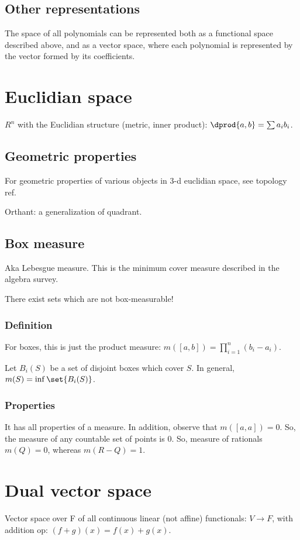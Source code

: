 \documentclass[oneside, article]{memoir}
\begin{document}
\subsection{Other representations}
The space of all polynomials can be represented both as a functional space described above, and as a vector space, where each polynomial is represented by the vector formed by its coefficients.

\section{Euclidian space}
$R^{n}$ with the Euclidian structure (metric, inner product): $\dprod{a, b} = \sum a_{i}b_{i}$.

\subsection{Geometric properties}
For geometric properties of various objects in 3-d euclidian space, see topology ref.

Orthant: a generalization of quadrant.

\subsection{Box measure}
Aka Lebesgue measure. This is the minimum cover measure described in the algebra survey.

There exist sets which are not box-measurable!\why

\subsubsection{Definition}
For boxes, this is just the product measure: $m([a, b]) = \prod_{i=1}^{n}(b_i- a_i)$.

Let $B_i(S)$ be a set of disjoint boxes which cover $S$. In general, $m(S) = \inf \set{B_i(S)}$.

\subsubsection{Properties}
It has all properties of a measure. In addition, observe that $m([a, a])=0$. So, the measure of any countable set of points is $0$. So, measure of rationals $m(Q) = 0$, whereas $m(R-Q) = 1$.

\section{Dual vector space }
Vector space over F of all continuous linear (not affine) functionals: $V\to F$, with addition op: $(f+g)(x) = f(x) + g(x)$.
\end{document}
